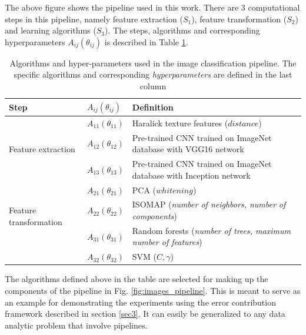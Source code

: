  The above figure shows the pipeline used in this work. There are 3 computational steps in this pipeline, namely feature extraction ($S_1$), feature transformation ($S_2$) and learning algorithms ($S_3$). The steps, algorithms and corresponding hyperparameters $A_{ij}(\theta_{ij})$ is described in Table \ref{table:algorithms_table}.

\begin{table}[ht!]
\centering
\caption{Algorithms and hyper-parameters used in the image classification pipeline. The specific algorithms and corresponding \textit{hyperparameters} are defined in the last column}
\begin{tabular}{@{} |m{9.7em}|m{1.5cm}|m{8cm}| @{}} 
 \hline
 Step & $A_{ij}(\theta_{ij})$ & Definition \\ 
 \hline
 \multirow{3}{*}{Feature extraction} & $A_{11}(\theta_{11})$ & Haralick texture features ($distance$) \\ 
 & $A_{12}(\theta_{12})$ & Pre-trained CNN trained on ImageNet \cite{deng2009imagenet} database with VGG16 \cite{simonyan2014very} network  \\
  & $A_{13}(\theta_{13})$ & Pre-trained CNN trained on ImageNet \cite{deng2009imagenet} database with Inception \cite{szegedy2016rethinking} network  \\
 \hline
 \multirow{3}{*}{Feature transformation} & $A_{21}(\theta_{21})$ & PCA ($whitening$) \cite{wold1987principal} \\
 & $A_{22}(\theta_{22})$ & ISOMAP (\textit{number of neighbors, number of components}) \cite{tenenbaum2000global} \\
 \hline
 \multirow{3}{*}{Learning algorithms} & $A_{31}(\theta_{31})$ & Random forests (\textit{number of trees, maximum number of features}) \cite{breiman2001random} \\
 & $A_{32}(\theta_{32})$ & SVM ($C, \gamma$) \cite{cortes1995support}\\
 \hline
 \end{tabular}
 \label{table:algorithms_table}
\end{table}
The algorithms defined above in the table are selected for making up the components of the pipeline in Fig. \ref{fig:images_pipeline}. This is meant to serve as an example for demonstrating the experiments using the error contribution framework described in section \ref{sec3}. It can easily be generalized to any data analytic problem that involve pipelines. 


